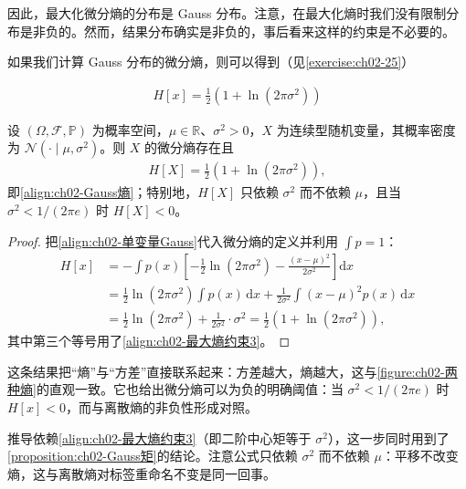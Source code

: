 \documentclass[../../main.tex]{subfiles}
\begin{document}
因此，最大化微分熵的分布是 Gauss 分布。注意，在最大化熵时我们没有限制分布是非负的。然而，结果分布确实是非负的，事后看来这样的约束是不必要的。

如果我们计算 Gauss 分布的微分熵，则可以得到（见\cref{exercise:ch02-25}）

\begin{align}
  H[x] = \frac{1}{2}\left(1+\ln(2\pi\sigma^{2})\right)
  \label{align:ch02-Gauss熵}
\end{align}

\begin{proposition}\label{proposition:ch02-Gauss熵}
设 $(\Omega,\mathcal{F},\mathbb{P})$ 为概率空间，$\mu\in\mathbb{R}$、$\sigma^{2}>0$，$X$ 为连续型随机变量，其概率密度为 $\mathcal{N}(\cdot\mid\mu,\sigma^{2})$。则 $X$ 的微分熵存在且
\begin{align*}
  H[X]=\frac{1}{2}\left(1+\ln(2\pi\sigma^{2})\right),
\end{align*}
即\eqref{align:ch02-Gauss熵}；特别地，$H[X]$ 只依赖 $\sigma^{2}$ 而不依赖 $\mu$，且当 $\sigma^{2}<1/(2\pi e)$ 时 $H[X]<0$。
\end{proposition}

\begin{proof}
把\eqref{align:ch02-单变量Gauss}代入微分熵的定义并利用 $\int p=1$：
\begin{align*}
  H[x] &= -\int p(x)\left[-\frac{1}{2}\ln(2\pi\sigma^{2}) - \frac{(x-\mu)^{2}}{2\sigma^{2}}\right]\mathrm{d}x \\
  &= \frac{1}{2}\ln(2\pi\sigma^{2})\int p(x)\,\mathrm{d}x + \frac{1}{2\sigma^{2}}\int(x-\mu)^{2}p(x)\,\mathrm{d}x \\
  &= \frac{1}{2}\ln(2\pi\sigma^{2}) + \frac{1}{2\sigma^{2}}\cdot\sigma^{2} = \frac{1}{2}\left(1+\ln(2\pi\sigma^{2})\right),
\end{align*}
其中第三个等号用了\eqref{align:ch02-最大熵约束3}。
\end{proof}

\begin{remark}
这条结果把“熵”与“方差”直接联系起来：方差越大，熵越大，这与\cref{figure:ch02-两种熵}的直观一致。它也给出微分熵可以为负的明确阈值：当 $\sigma^{2}<1/(2\pi e)$ 时 $H[x]<0$，而与离散熵的非负性形成对照。

推导依赖\eqref{align:ch02-最大熵约束3}（即二阶中心矩等于 $\sigma^{2}$），这一步同时用到了\cref{proposition:ch02-Gauss矩}的结论。注意公式只依赖 $\sigma^{2}$ 而不依赖 $\mu$：平移不改变熵，这与离散熵对标签重命名不变是同一回事。
\end{remark}
\end{document}
